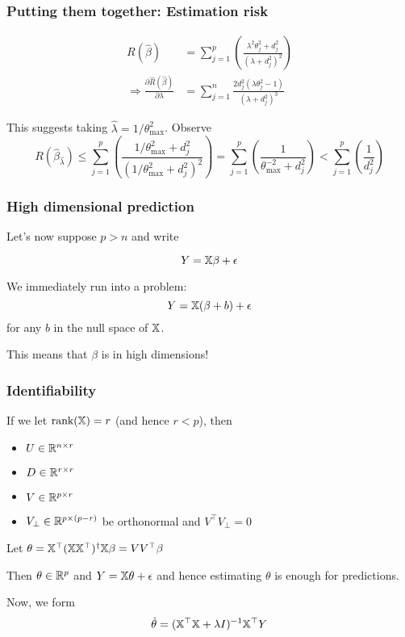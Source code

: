 \documentclass[12pt]{beamer}
\begin{document}
\begin{frame}
\frametitle{Putting them together: Estimation risk}
\begin{align}
R(\hat\beta) 
& = 
\sum_{j=1}^p \left(\frac{\lambda^2 \theta_j^2 + d_j^2}{(\lambda  + d_j^2)^2}\right)\\ 
\Rightarrow \frac{\partial \hat{R}(\hat\beta)}{\partial \lambda} 
& = 
\sum_{j=1}^n \frac{2d_j^2(\lambda \theta_j^2 - 1)}{(\lambda+d_j^2)^3}
\end{align}
\pause

This suggests taking $\hat\lambda = 1/\theta_{\max}^2$.  Observe
\[
R(\hat\beta_{\hat\lambda})
\leq
\sum_{j=1}^p \left(\frac{1/\theta_{\max}^2 + d_j^2}{(1/\theta_{\max}^2  + d_j^2)^2}\right)  
=
\sum_{j=1}^p \left(\frac{1}{\theta_{\max}^{-2}  + d_j^2}\right)  
<
\sum_{j=1}^p \left(\frac{1}{d_j^2}\right)  
\]
\end{frame}

\begin{frame}
\frametitle{High dimensional prediction}
Let's now suppose $p > n$ and write

\[
Y = \mathbb{X} \beta + \epsilon 
\]
\vsp

We immediately run into a problem:
\[
Y = \mathbb{X}(\beta + b) + \epsilon
\]
for any $b$ in the null space of $\mathbb{X}$.

\vsp
This means that $\beta$ is  in high dimensions!

\end{frame}

\begin{frame}
\frametitle{Identifiability}
If we let $\textrm{rank}(\mathbb{X}) = r$ (and hence $r < p$), then 
\begin{itemize}
\item $U \in \mathbb{R}^{n\times r}$
\item $D \in \mathbb{R}^{r\times r}$ 
\item $V \in \mathbb{R}^{p\times r}$
\item  $V_{\perp} \in \mathbb{R}^{p \times (p - r)}$ be orthonormal and $V^{\top} V_{\perp} = 0$
\end{itemize}

\vsp
Let $\theta = \mathbb{X}^{\top}(\mathbb{X} \mathbb{X}^{\top})^{\dagger} \mathbb{X} \beta = VV^{\top}\beta$

\vsp
Then $\theta \in \mathbb{R}^p$ and $Y = \mathbb{X}\theta + \epsilon$ and hence estimating $\theta$ is enough for
predictions.

\vsp
Now, we form
\[
\hat\theta = (\mathbb{X}^{\top}\mathbb{X} + \lambda I)^{-1} \mathbb{X}^{\top} Y
\]
\end{frame}
\end{document}
